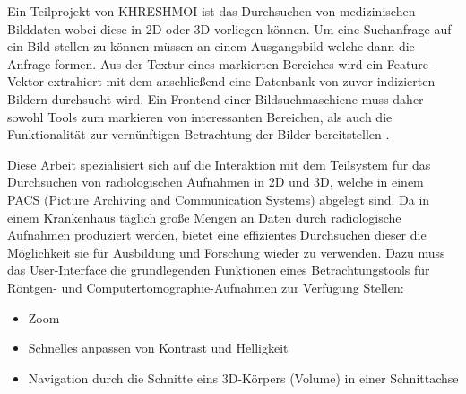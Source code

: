 Ein Teilprojekt von KHRESHMOI ist das Durchsuchen von medizinischen Bilddaten wobei diese in 2D oder 3D vorliegen können.
Um eine Suchanfrage auf ein Bild stellen zu können müssen an einem Ausgangsbild  welche dann die Anfrage formen.
Aus der Textur eines markierten Bereiches wird ein Feature-Vektor extrahiert mit dem anschließend eine Datenbank von zuvor indizierten Bildern durchsucht wird.
%
Ein Frontend einer Bildsuchmaschiene muss daher sowohl Tools zum markieren von interessanten Bereichen, 
als auch die Funktionalität zur vernünftigen Betrachtung der Bilder bereitstellen \cite{kres}.

Diese Arbeit spezialisiert sich auf die Interaktion mit dem Teilsystem für das Durchsuchen von radiologischen Aufnahmen in 2D und 3D,
welche in einem PACS (Picture Archiving and Communication Systems) abgelegt sind.
Da in einem Krankenhaus täglich große Mengen an Daten durch radiologische Aufnahmen produziert werden, 
bietet eine effizientes Durchsuchen dieser die Möglichkeit  sie für Ausbildung und Forschung wieder zu verwenden.
%
Dazu muss das User-Interface die grundlegenden Funktionen eines Betrachtungstools für Röntgen- und Computertomographie-Aufnahmen zur Verfügung Stellen:
\begin{itemize}
	\item Zoom
	\item Schnelles anpassen von Kontrast und Helligkeit
	\item Navigation durch die Schnitte eins 3D-Körpers (Volume) in einer Schnittachse
\end{itemize}
\cite{pacs}

